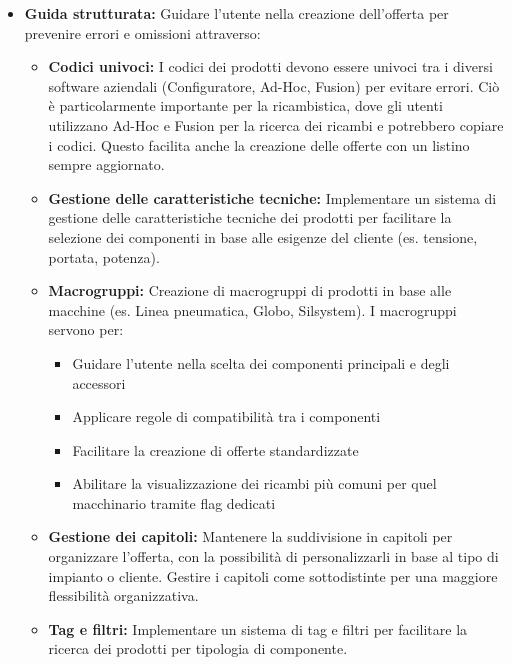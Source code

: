 \documentclass[12pt, a4paper]{article}
\begin{document}
\begin{itemize}
      \item \textbf{Guida strutturata:} Guidare l'utente nella creazione dell'offerta per prevenire errori e omissioni attraverso:

            \begin{itemize}
                  \item \textbf{Codici univoci:} I codici dei prodotti devono essere univoci tra i diversi software aziendali (Configuratore, Ad-Hoc, Fusion) per evitare errori. Ciò è particolarmente importante per la ricambistica, dove gli utenti utilizzano Ad-Hoc e Fusion per la ricerca dei ricambi e potrebbero copiare i codici. Questo facilita anche la creazione delle offerte con un listino sempre aggiornato.

                  \item \textbf{Gestione delle caratteristiche tecniche:} Implementare un sistema di gestione delle caratteristiche tecniche dei prodotti per facilitare la selezione dei componenti in base alle esigenze del cliente (es. tensione, portata, potenza).

                  \item \textbf{Macrogruppi:} Creazione di macrogruppi di prodotti in base alle macchine (es. Linea pneumatica, Globo, Silsystem). I macrogruppi servono per:
                        \begin{itemize}
                              \item Guidare l'utente nella scelta dei componenti principali e degli accessori
                              \item Applicare regole di compatibilità tra i componenti
                              \item Facilitare la creazione di offerte standardizzate
                              \item Abilitare la visualizzazione dei ricambi più comuni per quel macchinario tramite flag dedicati
                        \end{itemize}

                  \item \textbf{Gestione dei capitoli:} Mantenere la suddivisione in capitoli per organizzare l'offerta, con la possibilità di personalizzarli in base al tipo di impianto o cliente. Gestire i capitoli come sottodistinte per una maggiore flessibilità organizzativa.

                  \item \textbf{Tag e filtri:} Implementare un sistema di tag e filtri per facilitare la ricerca dei prodotti per tipologia di componente.


\end{itemize}
\end{itemize}
\end{document}
